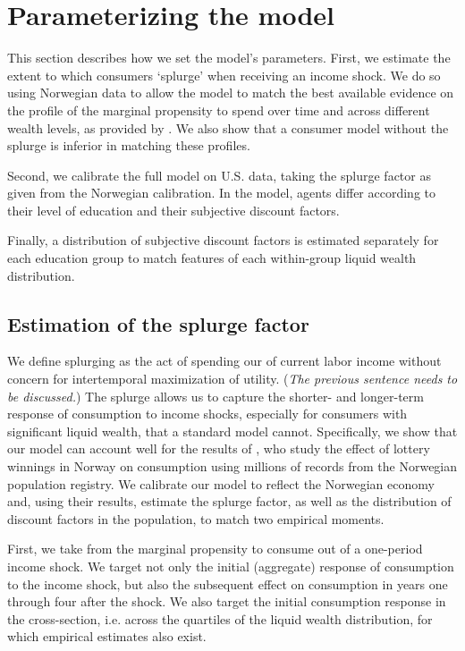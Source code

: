 \documentclass[\econtexRoot/HAFiscal]{subfiles}
\begin{document}
\hypertarget{parameterizing-the-model}{}\par\section{Parameterizing the model}

This section describes how we set the model's parameters. First, we estimate the extent to which consumers `splurge' when receiving an income shock. We do so using Norwegian data to allow the model to match the best available evidence on the profile of the marginal propensity to spend over time and across different wealth levels, as provided by \citet{fagereng2021mpc}. We also show that a consumer model without the splurge is inferior in matching these profiles.

Second, we calibrate the full model on U.S. data, taking the splurge factor as given from the Norwegian calibration. In the model, agents differ according to their level of education and their subjective discount factors. 

Finally, a distribution of subjective discount factors is estimated separately for each education group to match features of each within-group liquid wealth distribution. 

\hypertarget{estimation-of-the-splurge-factor}{}\par\subsection{Estimation of the splurge factor}
\notinsubfile{\label{sec:splurge}}

We define splurging as the act of spending our of current labor income without concern for intertemporal maximization of utility. (\textit{The previous sentence needs to be discussed.}) The splurge allows us to capture the shorter- and longer-term response of consumption to income shocks, especially for consumers with significant liquid wealth, that a standard model cannot. Specifically, we show that our model can account well for the results of \citet{fagereng2021mpc}, who study the effect of lottery winnings in Norway on consumption using millions of records from the Norwegian population registry. We calibrate our model to reflect the Norwegian economy and, using their results, estimate the splurge factor, as well as the distribution of discount factors in the population, to match two empirical moments. 

First, we take from \citet{fagereng2021mpc} the marginal propensity to consume out of a one-period income shock. We target not only the initial (aggregate) response of consumption to the income shock, but also the subsequent effect on consumption in years one through four after the shock. We also target the initial consumption response in the cross-section, i.e. across the quartiles of the liquid wealth distribution, for which empirical estimates also exist. 
\end{document}
